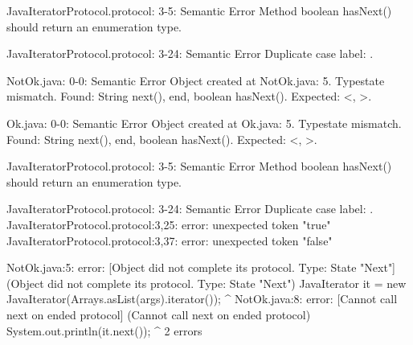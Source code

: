 \lstset{language=,caption=Mungo's output}
\begin{code}

JavaIteratorProtocol.protocol: 3-5: Semantic Error
		Method boolean hasNext() should return an enumeration type.

JavaIteratorProtocol.protocol: 3-24: Semantic Error
		Duplicate case label: .

NotOk.java: 0-0: Semantic Error
		Object created at NotOk.java: 5. Typestate mismatch. Found: String next(), end, boolean hasNext(). Expected: <, >.

Ok.java: 0-0: Semantic Error
		Object created at Ok.java: 5. Typestate mismatch. Found: String next(), end, boolean hasNext(). Expected: <, >.

JavaIteratorProtocol.protocol: 3-5: Semantic Error
		Method boolean hasNext() should return an enumeration type.

JavaIteratorProtocol.protocol: 3-24: Semantic Error
		Duplicate case label: .
JavaIteratorProtocol.protocol:3,25: error: unexpected token "true"
JavaIteratorProtocol.protocol:3,37: error: unexpected token "false"
\end{code}

\lstset{language=,caption=Our tool's output}
\begin{code}
NotOk.java:5: error: [Object did not complete its protocol. Type: State "Next"] (Object did not complete its protocol. Type: State "Next")
    JavaIterator it = new JavaIterator(Arrays.asList(args).iterator());
                 ^
NotOk.java:8: error: [Cannot call next on ended protocol] (Cannot call next on ended protocol)
      System.out.println(it.next());
                                ^
2 errors
\end{code}

